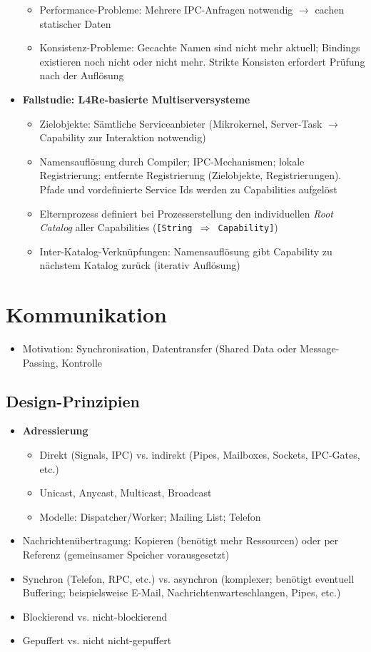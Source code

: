 \begin{itemize}
\begin{itemize}
		\item Performance-Probleme: Mehrere IPC-Anfragen notwendig \(\rightarrow\) cachen statischer Daten
		\item Konsistenz-Probleme: Gecachte Namen sind nicht mehr aktuell; Bindings existieren noch nicht oder nicht mehr. Strikte Konsisten erfordert Prüfung nach der Auflösung
	\end{itemize}
	\item \textbf{Fallstudie: L4Re-basierte Multiserversysteme}
	\begin{itemize}
		\item Zielobjekte: Sämtliche Serviceanbieter (Mikrokernel, Server-Task \(\rightarrow\) Capability zur Interaktion notwendig)
		\item Namensauflösung durch Compiler; IPC-Mechanismen; lokale Registrierung; entfernte Registrierung (Zielobjekte, Registrierungen). Pfade und vordefinierte Service Ids werden zu Capabilities aufgelöst
		\item Elternprozess definiert bei Prozesserstellung den individuellen \textit{Root Catalog} aller Capabilities (\texttt{[String \(\Rightarrow\) Capability]})
		\item Inter-Katalog-Verknüpfungen: Namensauflösung gibt Capability zu nächstem Katalog zurück (iterativ Auflösung)
	\end{itemize}
\end{itemize}



\section{Kommunikation}
\begin{itemize}
	\item Motivation: Synchronisation, Datentransfer (Shared Data oder Message-Passing, Kontrolle
\end{itemize}

\subsection{Design-Prinzipien}
\begin{itemize}
	\item \textbf{Adressierung}
	\begin{itemize}
		\item Direkt (Signals, IPC) vs. indirekt (Pipes, Mailboxes, Sockets, IPC-Gates, etc.)
		\item Unicast, Anycast, Multicast, Broadcast
		\item Modelle: Dispatcher/Worker; Mailing List; Telefon
	\end{itemize}
	\item Nachrichtenübertragung: Kopieren (benötigt mehr Ressourcen) oder per Referenz (gemeinsamer Speicher vorausgesetzt)
	\item Synchron (Telefon, RPC, etc.) vs. asynchron (komplexer; benötigt eventuell Buffering; beispielsweise E-Mail, Nachrichtenwarteschlangen, Pipes, etc.)
	\item Blockierend vs. nicht-blockierend
	\item Gepuffert vs. nicht nicht-gepuffert
\end{itemize}


